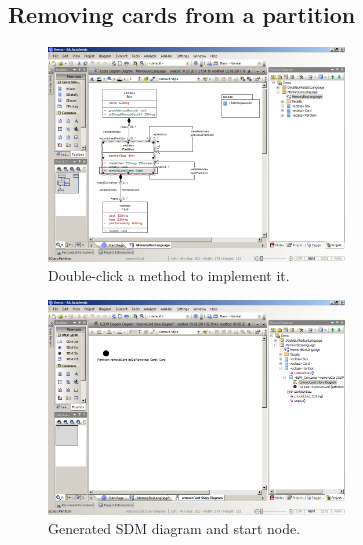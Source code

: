 \subsection{Removing cards from a partition}
\begin{figure}[htp]
\begin{center}
  \includegraphics[width=0.7\textwidth]{pics/sdmBilder/removeCard/sdm01RAW}
  \caption{Double-click a method to implement it.}  
  \label{fig:sdm_start}
\end{center}
\end{figure}

\begin{figure}[htp]
\begin{center}
  \includegraphics[width=0.7\textwidth]{pics/sdmBilder/removeCard/sdm02RAW}
  \caption{Generated SDM diagram and start node.}  
  \label{fig:sdm_skeleton}
\end{center}
\end{figure}

